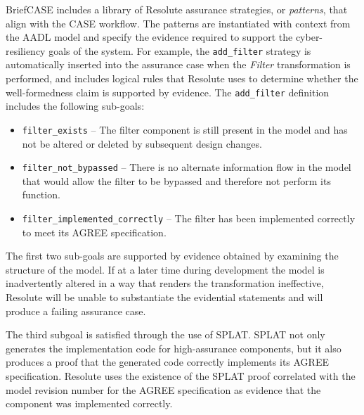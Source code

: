 BriefCASE includes a library of Resolute assurance strategies, or \emph{patterns}, that align with
the CASE workflow. The patterns are instantiated with context from the AADL model and specify the
evidence required to support the cyber-resiliency goals of the system. For example, the
\texttt{add\_filter} strategy is automatically inserted into the assurance case when the
\textit{Filter} transformation is performed, and includes logical rules that Resolute uses to
determine whether the well-formedness claim is supported by evidence. The \texttt{add\_filter}
definition 
includes the following sub-goals:
\begin{itemize} 
\item \texttt{filter\_exists} -- The filter component is still present in the model and has not be 
altered or deleted by subsequent design changes. 
\item \texttt{filter\_not\_bypassed} -- There is no alternate information flow in the model that 
would allow the filter to be bypassed and therefore not perform its function.   
\item \texttt{filter\_implemented\_correctly} -- The filter has been implemented correctly 
to meet its AGREE specification.  
\end{itemize}

The first two sub-goals are supported by evidence obtained by examining the structure of the model. 
If at a later time during development the model is inadvertently altered in a way that renders the transformation
ineffective, Resolute will be unable to substantiate the evidential statements and will
produce a failing assurance case.

The third subgoal is satisfied through the use of SPLAT. SPLAT not only generates the implementation code for
high-assurance components, but it also produces a proof that the generated code correctly 
implements its AGREE specification. Resolute uses the existence of the
SPLAT proof correlated with the model revision number for the AGREE specification
as evidence that the component was implemented correctly.





